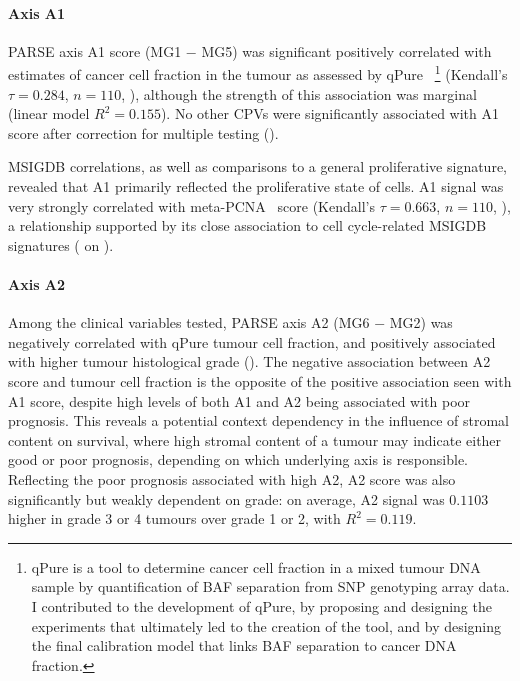 \documentclass[dissertation.tex]{subfiles}
\begin{document}
\paragraph{Axis A1}
\gls{PARSE} axis A1 score (MG1 $-$ MG5) was significant positively correlated with estimates of cancer cell fraction in the tumour as assessed by qPure~\cite{Song2012} \footnote{qPure is a tool to determine cancer cell fraction in a mixed tumour DNA sample by quantification of \gls{BAF} separation from \gls{SNP} genotyping array data.  I contributed to the development of qPure, by proposing and designing the experiments that ultimately led to the creation of the tool, and by designing the final calibration model that links \gls{BAF} separation to cancer DNA fraction.} (Kendall's $\tau = 0.284$, $n = 110$, ), although the strength of this association was marginal (linear model $R^2 = 0.155$).  No other \glspl{CPV} were significantly associated with A1 score after correction for multiple testing ().

\gls{MSIGDB} correlations, as well as comparisons to a general proliferative signature, revealed that A1 primarily reflected the proliferative state of cells.  A1 signal was very strongly correlated with meta-PCNA~\cite{Venet2011} score (Kendall's $\tau = 0.663$, $n = 110$, ), a relationship supported by its close association to cell cycle-related \gls{MSIGDB} signatures ( on ).

\paragraph{Axis A2}
Among the clinical variables tested, \gls{PARSE} axis A2 (MG6 $-$ MG2) was negatively correlated with qPure tumour cell fraction, and positively associated with higher tumour histological grade ().  The negative association between A2 score and tumour cell fraction is the opposite of the positive association seen with A1 score, despite high levels of both A1 and A2 being associated with poor prognosis.  This reveals a potential context dependency in the influence of stromal content on survival, where high stromal content of a tumour may indicate either good or poor prognosis, depending on which underlying axis is responsible.  Reflecting the poor prognosis associated with high A2, A2 score was also significantly but weakly dependent on grade: on average, A2 signal was $0.1103$ higher in grade 3 or 4 tumours over grade 1 or 2, with $R^2 = 0.119$.
\end{document}
